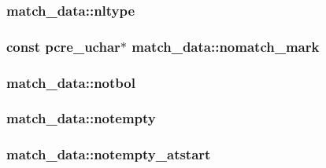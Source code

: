 \subsubsection[{\texorpdfstring{nltype}{nltype}}]{ match\+\_\+data\+::nltype}\hypertarget{structmatch__data_a2633f641c966b838ce255ce6da811fb1}{}\label{structmatch__data_a2633f641c966b838ce255ce6da811fb1}
\subsubsection[{\texorpdfstring{nomatch\+\_\+mark}{nomatch_mark}}]{\setlength{\rightskip}{0pt plus 5cm}const {\bf pcre\+\_\+uchar}$\ast$ match\+\_\+data\+::nomatch\+\_\+mark}\hypertarget{structmatch__data_a8f7c4a2482265e8522741369421638c4}{}\label{structmatch__data_a8f7c4a2482265e8522741369421638c4}
\subsubsection[{\texorpdfstring{notbol}{notbol}}]{ match\+\_\+data\+::notbol}\hypertarget{structmatch__data_a5723b871728ec786b1df1c451c243aa0}{}\label{structmatch__data_a5723b871728ec786b1df1c451c243aa0}
\subsubsection[{\texorpdfstring{notempty}{notempty}}]{ match\+\_\+data\+::notempty}\hypertarget{structmatch__data_a084eb4505d2cf83c879ac625c83c72c5}{}\label{structmatch__data_a084eb4505d2cf83c879ac625c83c72c5}
\subsubsection[{\texorpdfstring{notempty\+\_\+atstart}{notempty_atstart}}]{ match\+\_\+data\+::notempty\+\_\+atstart}\hypertarget{structmatch__data_ab5d9715290945b2033c85f7ade584633}{}\label{structmatch__data_ab5d9715290945b2033c85f7ade584633}
